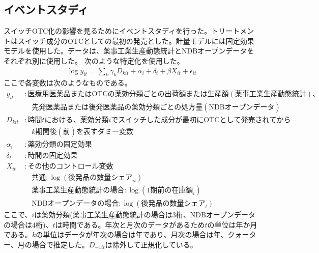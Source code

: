 \documentclass[a4paper,11pt,uplatex]{jsarticle}
\theoremstyle{definition}
\begin{document}
\subsection{イベントスタディ}
スイッチOTC化の影響を見るためにイベントスタディを行った。トリートメントはスイッチ成分のOTCとしての最初の発売とした。計量モデルには固定効果モデルを使用した。データは、薬事工業生産動態統計とNDBオープンデータをそれぞれ別に使用した。
次のような特定化を使用した。
\begin{align*}
\log y_{it} =\sum_k \gamma_k D_{kit}+\alpha_i +\delta_t+\beta X_{it}+\epsilon_{it}
\end{align*}
ここで各変数は次のようなものである。
\begin{align*}
y_{it}&: 医療用医薬品または\textrm{OTC} の薬効分類ごとの出荷額または生産額(薬事工業生産動態統計)、\\
& \quad 先発医薬品または後発医薬品の薬効分類ごとの処方量( \textrm{NDB} オープンデータ)\\
D_{kit}&: 時間tにおける、薬効分類iでスイッチした成分が最初に \textrm{OTC} として発売されてから\\
& \quad k期間後(前)を表すダミー変数\\
\alpha_i&: 薬効分類の固定効果\\
\delta_t&: 時間の固定効果\\
X_{it}&: その他のコントロール変数\\
    &\quad 共通: \log(後発品の数量シェア_{it})\\
    &\quad 薬事工業生産動態統計の場合: \log(1期前の在庫額_i)\\
    & \quad \textrm{NDB} オープンデータの場合: \log(後発品の数量シェア_t) 
\end{align*}
ここで、\(i\)は薬効分類(薬事工業生産動態統計の場合は3桁、NDBオープンデータの場合は4桁)、\(t\)は時間である。年次と月次のデータがあるため\(t\)の単位は年か月である。\(k\)の単位はデータが年次の場合は年であり、月次の場合は年、クォーター、月の場合で推定した。\(D_{-1it}\)は除外して正規化している。
\end{document}
